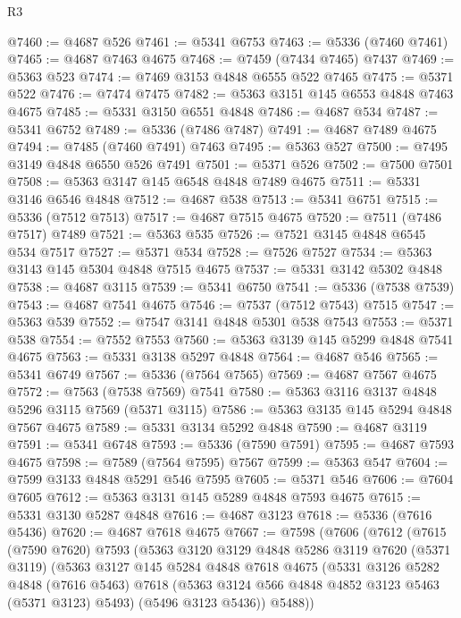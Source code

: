 \begin{lexlean}{R3}
\begin{coremodule}
@7460 := @4687 @526
@7461 := @5341 @6753
@7463 := @5336 (@7460 @7461)
@7465 := @4687 @7463 @4675
@7468 := @7459 (@7434 @7465) @7437
@7469 := @5363 @523
@7474 := @7469 @3153 @4848 @6555 @522 @7465
@7475 := @5371 @522
@7476 := @7474 @7475
@7482 := @5363 @3151 @145 @6553 @4848 @7463 @4675
@7485 := @5331 @3150 @6551 @4848
@7486 := @4687 @534
@7487 := @5341 @6752
@7489 := @5336 (@7486 @7487)
@7491 := @4687 @7489 @4675
@7494 := @7485 (@7460 @7491) @7463
@7495 := @5363 @527
@7500 := @7495 @3149 @4848 @6550 @526 @7491
@7501 := @5371 @526
@7502 := @7500 @7501
@7508 := @5363 @3147 @145 @6548 @4848 @7489 @4675
@7511 := @5331 @3146 @6546 @4848
@7512 := @4687 @538
@7513 := @5341 @6751
@7515 := @5336 (@7512 @7513)
@7517 := @4687 @7515 @4675
@7520 := @7511 (@7486 @7517) @7489
@7521 := @5363 @535
@7526 := @7521 @3145 @4848 @6545 @534 @7517
@7527 := @5371 @534
@7528 := @7526 @7527
@7534 := @5363 @3143 @145 @5304 @4848 @7515 @4675
@7537 := @5331 @3142 @5302 @4848
@7538 := @4687 @3115
@7539 := @5341 @6750
@7541 := @5336 (@7538 @7539)
@7543 := @4687 @7541 @4675
@7546 := @7537 (@7512 @7543) @7515
@7547 := @5363 @539
@7552 := @7547 @3141 @4848 @5301 @538 @7543
@7553 := @5371 @538
@7554 := @7552 @7553
@7560 := @5363 @3139 @145 @5299 @4848 @7541 @4675
@7563 := @5331 @3138 @5297 @4848
@7564 := @4687 @546
@7565 := @5341 @6749
@7567 := @5336 (@7564 @7565)
@7569 := @4687 @7567 @4675
@7572 := @7563 (@7538 @7569) @7541
@7580 := @5363 @3116 @3137 @4848 @5296 @3115 @7569 (@5371 @3115)
@7586 := @5363 @3135 @145 @5294 @4848 @7567 @4675
@7589 := @5331 @3134 @5292 @4848
@7590 := @4687 @3119
@7591 := @5341 @6748
@7593 := @5336 (@7590 @7591)
@7595 := @4687 @7593 @4675
@7598 := @7589 (@7564 @7595) @7567
@7599 := @5363 @547
@7604 := @7599 @3133 @4848 @5291 @546 @7595
@7605 := @5371 @546
@7606 := @7604 @7605
@7612 := @5363 @3131 @145 @5289 @4848 @7593 @4675
@7615 := @5331 @3130 @5287 @4848
@7616 := @4687 @3123
@7618 := @5336 (@7616 @5436)
@7620 := @4687 @7618 @4675
@7667 := @7598
    (@7606
      (@7612
        (@7615
          (@7590 @7620)
          @7593
          (@5363
            @3120
            @3129
            @4848
            @5286
            @3119
            @7620
            (@5371 @3119)
            (@5363
              @3127
              @145
              @5284
              @4848
              @7618
              @4675
              (@5331
                @3126
                @5282
                @4848
                (@7616 @5463)
                @7618
                (@5363 @3124 @566 @4848 @4852 @3123 @5463 (@5371 @3123) @5493)
                (@5496 @3123 @5436))
              @5488))

\end{coremodule}
\end{lexlean}
